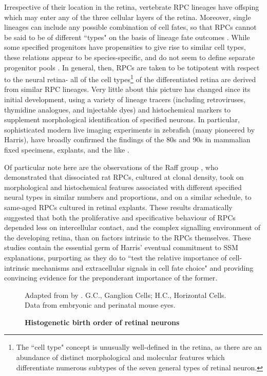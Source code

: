 Irrespective of their location in the retina, vertebrate RPC lineages have offsping which may enter any of the three cellular layers of the retina. Moreover, single lineages can include any possible combination of cell fates, so that RPCs cannot be said to be of different ``types" on the basis of lineage fate outcomes \cite{Holt1988,Turner1990,Wetts1988}. While some specified progenitors have propensities to give rise to similar cell types, these relations appear to be species-specific, and do not seem to define separate progenitor pools \cite{Adler2008}. In general, then, RPCs are taken to be totipotent with respect to the neural retina- all of the cell types\footnote{The ``cell type" concept is unusually well-defined in the retina, as there are an abundance of distinct morphological and molecular features which differentiate numerous subtypes of the seven general types of retinal neuron.} of the differentiated retina are derived from similar RPC lineages. Very little about this picture has changed since its initial development, using a variety of lineage tracers (including retroviruses, thymidine analogues, and injectable dyes) and histochemical markers to supplement morphological identification of specified neurons. In particular, sophisticated modern live imaging experiments in zebrafish (many pioneered by Harris), have broadly confirmed the findings of the 80s and 90s in mammalian fixed specimens, explants, and the like \cite{Boije2015}.

\label{Raff}
Of particular note here are the observations of the Raff group \cite{Watanabe1990,Cayouette2003}, who demonstrated that dissociated rat RPCs, cultured at clonal density, took on morphological and histochemical features associated with different specified neural types in similar numbers and proportions, and on a similar schedule, to same-aged RPCs cultured in retinal explants. These results dramatically suggested that both the proliferative and specificative behaviour of RPCs depended less on intercellular contact, and the complex signalling environment of the developing retina, than on factors intrinsic to the RPCs themselves. These studies contain the essential germ of Harris' eventual commitment to SSM explanations, purporting as they do to ``test the relative importance of cell-intrinsic mechanisms and extracellular signals in cell fate choice" and providing convincing evidence for the preponderant importance of the former.

\begin{figure}[!h]
  \caption{{\bf Histogenetic birth order of retinal neurons}}
  Adapted from \cite{Young1985} by \cite{Cepko1996}. G.C., Ganglion Cells; H.C., Horizontal Cells. Data from embryonic and perinatal mouse eyes.
  \label{horder}
\end{figure}

